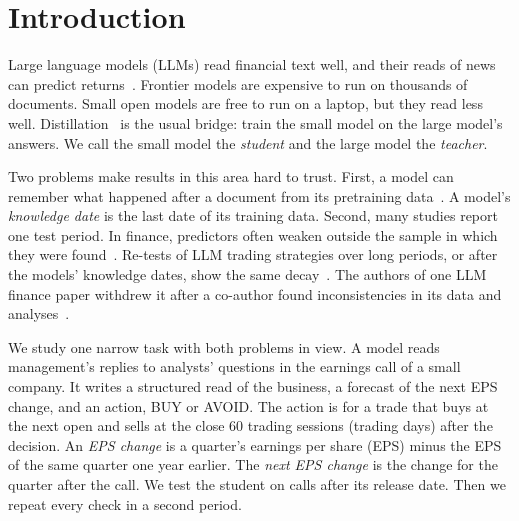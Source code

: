 \documentclass[sigconf,nonacm]{acmart}
\begin{document}
\section{Introduction}

Large language models (LLMs) read financial text well, and their reads of news can predict returns~\cite{lopezliratang2023}.
Frontier models are expensive to run on thousands of documents.
Small open models are free to run on a laptop, but they read less well.
Distillation~\cite{hinton2015} is the usual bridge: train the small model on the large model's answers.
We call the small model the \emph{student} and the large model the \emph{teacher}.

Two problems make results in this area hard to trust.
First, a model can remember what happened after a document from its pretraining data~\cite{glassermanlin2023,lopezlira2025memorization}.
A model's \emph{knowledge date} is the last date of its training data.
Second, many studies report one test period.
In finance, predictors often weaken outside the sample in which they were found~\cite{mcleanpontiff2016}.
Re-tests of LLM trading strategies over long periods, or after the models' knowledge dates, show the same decay~\cite{li2025finsaber,li2025profitmirage}.
The authors of one LLM finance paper withdrew it after a co-author found inconsistencies in its data and analyses~\cite{kim2024fsa}.

We study one narrow task with both problems in view.
A model reads management's replies to analysts' questions in the earnings call of a small company.
It writes a structured read of the business, a forecast of the next EPS change, and an action, BUY or AVOID.
The action is for a trade that buys at the next open and sells at the close 60 trading sessions (trading days) after the decision.
An \emph{EPS change} is a quarter's earnings per share (EPS) minus the EPS of the same quarter one year earlier.
The \emph{next EPS change} is the change for the quarter after the call.
We test the student on calls after its release date.
Then we repeat every check in a second period.
\end{document}
